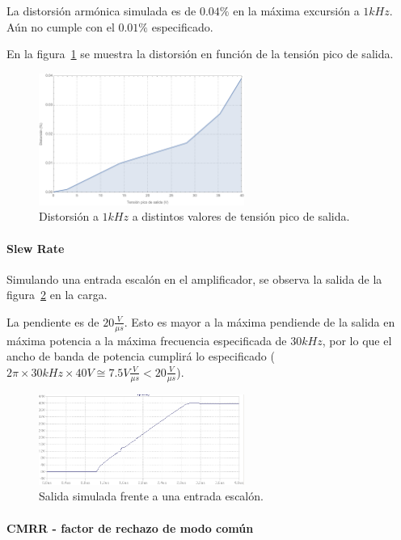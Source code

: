 \documentclass[a4paper,12pt,twoside]{article}
\begin{document}
La distorsión armónica simulada es de $0.04\%$ en la máxima excursión a $1kHz$. Aún no cumple con el $0.01\%$ especificado.


En la figura~\ref{fig:distorsion-barrido} se muestra la distorsión en función de la tensión pico de salida.

\begin{figure}[H]
	\centering
	\includegraphics[width=0.6\textwidth]{img/sim/distorsion-barrido}
	\caption{Distorsión a $1kHz$ a distintos valores de tensión pico de salida.}
	\label{fig:distorsion-barrido}
\end{figure}


\paragraph{Slew Rate} Simulando una entrada escalón en el amplificador, se observa la salida de la figura~\ref{fig:slew} en la carga.

La pendiente es de $20 \frac{V}{\mu s}$. Esto es mayor a la máxima pendiende de la salida en máxima potencia a la máxima frecuencia especificada de $30kHz$, por lo que el ancho de banda de potencia cumplirá lo especificado ($2 \pi \times30kHz \times40V\cong 7.5V \frac{V}{\mu s}<20 \frac{V}{\mu s}$).


\begin{figure}[H]
	\centering
	\includegraphics[width=0.6\textwidth]{img/sim/slew}
	\caption{Salida simulada frente a una entrada escalón.}
	\label{fig:slew}
\end{figure}

\paragraph{CMRR - factor de rechazo de modo común}
\end{document}
